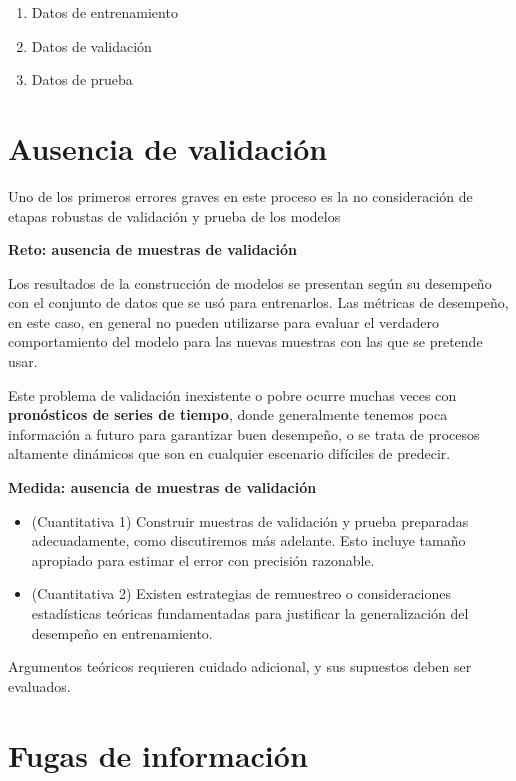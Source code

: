 \documentclass[
]{book}
\providecommand{\tightlist}{%
  \setlength{\itemsep}{0pt}\setlength{\parskip}{0pt}}
\let\BeginKnitrBlock\begin \let\EndKnitrBlock\end
\begin{document}
\begin{enumerate}
\def\labelenumi{\arabic{enumi}.}
\tightlist
\item
  Datos de entrenamiento
\item
  Datos de validación
\item
  Datos de prueba
\end{enumerate}

\hypertarget{ausencia-de-validaciuxf3n}{%
\section{Ausencia de validación}\label{ausencia-de-validaciuxf3n}}

Uno de los primeros errores graves en este proceso es la no consideración de
etapas robustas de validación y prueba de los modelos

\BeginKnitrBlock{rmdnote}
\textbf{Reto: ausencia de muestras de validación}

Los resultados de la construcción de modelos se presentan según su desempeño
con el conjunto de datos que se usó para entrenarlos. Las métricas de desempeño, en
este caso, en general no pueden utilizarse para evaluar el verdadero comportamiento del
modelo para las nuevas muestras con las que se pretende usar.
\EndKnitrBlock{rmdnote}

Este problema de validación inexistente o pobre ocurre muchas veces con \textbf{pronósticos de series de tiempo}, donde
generalmente tenemos poca información a futuro para garantizar buen desempeño, o se trata de procesos altamente dinámicos
que son en cualquier escenario difíciles de predecir.

\BeginKnitrBlock{rmdtip}
\textbf{Medida: ausencia de muestras de validación}

\begin{itemize}
\item
  (Cuantitativa 1) Construir muestras de validación y prueba preparadas adecuadamente, como discutiremos más adelante. Esto incluye tamaño apropiado para estimar el error con precisión razonable.
\item
  (Cuantitativa 2) Existen estrategias de remuestreo o consideraciones estadísticas teóricas fundamentadas para justificar la generalización del desempeño en entrenamiento.
\end{itemize}
\EndKnitrBlock{rmdtip}

Argumentos teóricos requieren cuidado adicional, y sus supuestos deben ser evaluados.

\hypertarget{fugas-de-informaciuxf3n}{%
\section{Fugas de información}\label{fugas-de-informaciuxf3n}}
\end{document}
